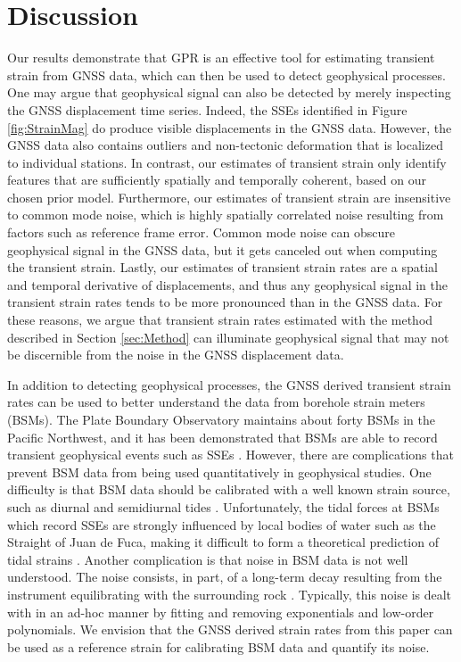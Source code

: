 \documentclass[extra,mreferee]{gji}
\begin{document}
\section{Discussion}\label{sec:Discussion}
Our results demonstrate that GPR is an effective tool for estimating transient strain from GNSS data, which can then be used to detect geophysical processes. One may argue that geophysical signal can also be detected by merely inspecting the GNSS displacement time series. Indeed, the SSEs identified in Figure \ref{fig:StrainMag} do produce visible displacements in the GNSS data. However, the GNSS data also contains outliers and non-tectonic deformation that is localized to individual stations. In contrast, our estimates of transient strain only identify features that are sufficiently spatially and temporally coherent, based on our chosen prior model. Furthermore, our estimates of transient strain are insensitive to common mode noise, which is highly spatially correlated noise resulting from factors such as reference frame error. Common mode noise can obscure geophysical signal in the GNSS data, but it gets canceled out when computing the transient strain. Lastly, our estimates of transient strain rates are a spatial and temporal derivative of displacements, and thus any geophysical signal in the transient strain rates tends to be more pronounced than in the GNSS data. For these reasons, we argue that transient strain rates estimated with the method described in Section \ref{sec:Method} can illuminate geophysical signal that may not be discernible from the noise in the GNSS displacement data. 

In addition to detecting geophysical processes, the GNSS derived transient strain rates can be used to better understand the data from borehole strain meters (BSMs). The Plate Boundary Observatory maintains about forty BSMs in the Pacific Northwest, and it has been demonstrated that BSMs are able to record transient geophysical events such as SSEs \citep[e.g.,][]{Dragert2011}. However, there are complications that prevent BSM data from being used quantitatively in geophysical studies. One difficulty is that BSM data should be calibrated with a well known strain source, such as diurnal and semidiurnal tides \citep{Hart1996,Roeloffs2010,Hodgkinson2013}. Unfortunately, the tidal forces at BSMs which record SSEs are strongly influenced by local bodies of water such as the Straight of Juan de Fuca, making it difficult to form a theoretical prediction of tidal strains \citep{Roeloffs2010}. Another complication is that noise in BSM data is not well understood. The noise consists, in part, of a long-term decay resulting from the instrument equilibrating with the surrounding rock \citep{Gladwin1987}. Typically, this noise is dealt with in an ad-hoc manner by fitting and removing exponentials and low-order polynomials. We envision that the GNSS derived strain rates from this paper can be used as a reference strain for calibrating BSM data and quantify its noise.    
\end{document}
